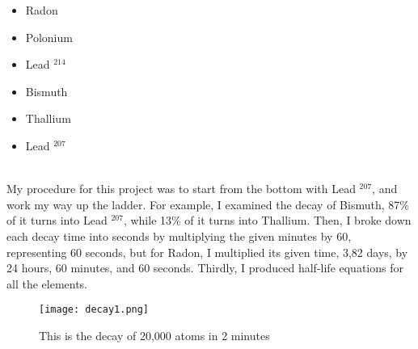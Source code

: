 \documentclass[12pt]{article}
\begin{document}
\begin{itemize}      %
\item Radon         %
\end{itemize}        %
\begin{itemize}
\item Polonium         %
\end{itemize}        %
\begin{itemize}
\item Lead $^{214}$         %
\end{itemize}        %
\begin{itemize}
    \item Bismuth
\end{itemize}
\begin{itemize}
    \item Thallium
\end{itemize}
\begin{itemize}
    \item Lead $^{207}$
\end{itemize}
\vskip0.1in
 \\

My procedure for this project was to start from the bottom with Lead $^{207}$, and work my way up the ladder. For example, I examined the decay of Bismuth, 87\% of it turns into Lead $^{207}$, while 13\% of it turns into Thallium. Then, I broke down each decay time into seconds by multiplying the given minutes by 60, representing 60 seconds, but for Radon, I multiplied its given time, 3,82 days, by 24 hours, 60 minutes, and 60 seconds. Thirdly, I produced half-life equations for all the elements. 


\clearpage %

\begin{figure}
    \centering
    \texttt{[image: decay1.png]}
    \caption{This is the decay of 20,000  atoms in 2 minutes}
    \label{fig:enter-label}
\end{figure}
\end{document}
